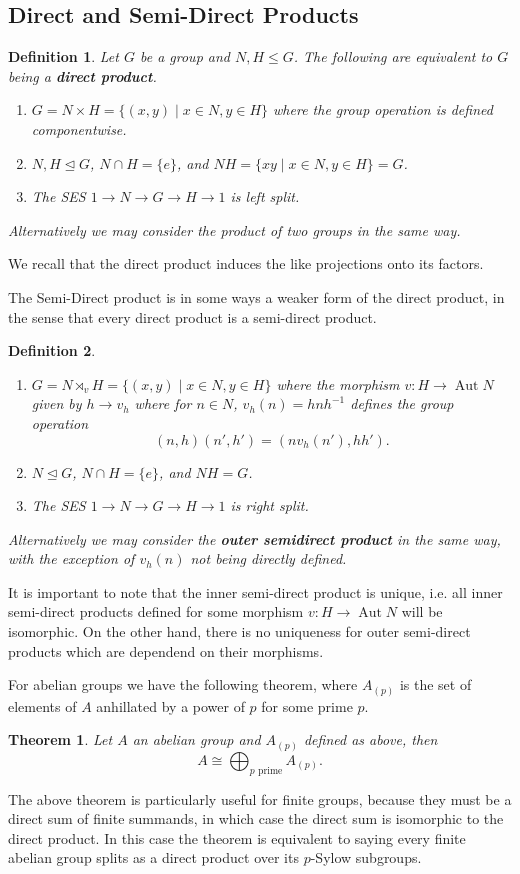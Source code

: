 \documentclass{report}
\DeclareMathOperator{\aut}{Aut}
\newtheorem{theorem}{Theorem}
\newtheorem{defi}{Definition}
\begin{document}
\begin{singlespace}
\begin{enumerate}
 \section{Direct and Semi-Direct Products}
 \begin{defi}
   Let $G$ be a group and $N,H\leq G$. The following are equivalent to $G$ being a \textbf{direct product}.
   \begin{enumerate}
   \item $G=N\times H=\{(x,y)\mid x\in N, y\in H\}$ where the group operation is defined componentwise.
   \item $N,H\trianglelefteq G$, $N\cap H=\{e\}$, and $NH=\{xy\mid x\in N, y\in H\}=G$.
   \item The SES $1\to N\to G\to H\to 1$ is left split.
   \end{enumerate}
   Alternatively we may consider the product of two groups in the same way.
 \end{defi}
 We recall that the direct product induces the like projections onto its factors.

 The Semi-Direct product is in some ways a weaker form of the direct product, in the sense that every direct product is a semi-direct product.
 \begin{defi}
 \begin{enumerate}
   Let $G$ be a group and $N,H\leq G$. The following are equivalent to $G$ being an \textbf{inner semi-direct product}.
   \item $G=N\rtimes_v H=\{(x,y)\mid x\in N, y\in H\}$ where the morphism $v:H\to \aut N$ given by $h\to v_h$ where for $n\in N$, $v_h(n)=hnh^{-1}$ defines the group operation
   \[(n,h)(n',h') = (nv_h(n'),hh').\]
   \item $N\trianglelefteq G$, $N\cap H=\{e\}$, and $NH=G$.
   \item The SES $1\to N\to G\to H\to 1$ is right split.
 \end{enumerate}
 Alternatively we may consider the \textbf{outer semidirect product} in the same way, with the exception of $v_h(n)$ not being directly defined.
\end{defi}
It is important to note that the inner semi-direct product is unique, i.e. all inner semi-direct products defined for some morphism $v:H\to \aut N$ will be isomorphic. On the other hand, there is no uniqueness for outer semi-direct products which are dependend on their morphisms.

For abelian groups we have the following theorem, where $A_{(p)}$ is the set of elements of $A$ anhillated by a power of $p$ for some prime $p$.
\begin{theorem}
  Let $A$ an abelian group and $A_{(p)}$ defined as above, then
  \[A\cong \bigoplus_{p\text{ prime}} A_{(p)}.\]
\end{theorem}
The above theorem is particularly useful for finite groups, because they must be a direct sum of finite summands, in which case the direct sum is isomorphic to the direct product. In this case the theorem is equivalent to saying every finite abelian group splits as a direct product over its $p$-Sylow subgroups.



\end{enumerate}
\end{singlespace}
\end{document}
